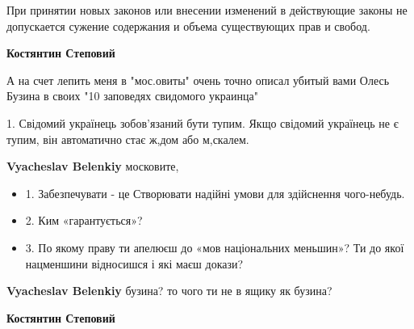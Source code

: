 \begin{itemize}
\begin{itemize}
При принятии новых законов или внесении изменений в действующие законы не
допускается сужение содержания и объема существующих прав и свобод.

 
\textbf{Костянтин Степовий} 

А на счет лепить меня в "мос.овиты" очень точно описал убитый вами Олесь Бузина
в своих "10 заповедях свидомого украинца"


1. Свідомий українець зобов’язаний бути тупим. Якщо свідомий українець не є
тупим, він автоматично стає ж,дом або м,скалем.

 
\textbf{Vyacheslav Belenkiy} московите,

\begin{itemize}
  \item 1. Забезпечувати - це Створювати надійні умови для здійснення чого-небудь.
  \item 2. Ким «гарантується»?
  \item 3. По якому праву ти апелюєш до «мов національних меньшин»? Ти до якої нацменшини відносишся і які маєш докази?
\end{itemize}

 
\textbf{Vyacheslav Belenkiy} бузина? то чого ти не в ящику як бузина?

 
\textbf{Костянтин Степовий}


\end{itemize}
\end{itemize}
